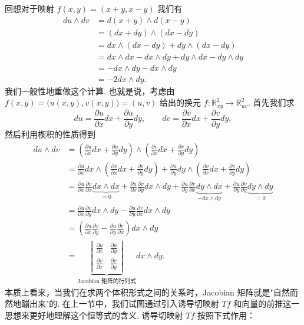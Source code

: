 回想对于映射 $f(x,y)=(x+y,x-y)$ 我们有
\begin{align*}
du\wedge dv&=d(x+y)\wedge d(x-y)\\
&=(dx+dy)\wedge(dx-dy)\\
&=dx\wedge(dx-dy)+dy\wedge(dx-dy)\\
&=dx\wedge dx-dx\wedge dy+dy\wedge dx-dy\wedge dy\\
&=-dx\wedge dy-dx\wedge dy\\
&=-2dx\wedge dy.
\end{align*}
我们一般性地重做这个计算. 也就是说，考虑由 $f(x,y)=\bigl(u(x,y),v(x,y)\bigr)=(u,v)$ 给出的换元 $f:\mathbb{R}^2_{xy}\to\mathbb{R}^2_{uv}$. 首先我们求
\[
du=\frac{\partial u}{\partial x}dx+\frac{\partial u}{\partial y}dy,\qquad
dv=\frac{\partial v}{\partial x}dx+\frac{\partial v}{\partial y}dy,
\]
然后利用楔积的性质得到
\begin{align*}
du\wedge dv&=\left(\frac{\partial u}{\partial x}dx+\frac{\partial u}{\partial y}dy\right)\wedge\left(\frac{\partial v}{\partial x}dx+\frac{\partial v}{\partial y}dy\right)\\
&=\frac{\partial u}{\partial x}dx\wedge\left(\frac{\partial v}{\partial x}dx+\frac{\partial v}{\partial y}dy\right)
+\frac{\partial u}{\partial y}dy\wedge\left(\frac{\partial v}{\partial x}dx+\frac{\partial v}{\partial y}dy\right)\\
&=\frac{\partial u}{\partial x}\frac{\partial v}{\partial x}\underbrace{dx\wedge dx}_{=0}
+\frac{\partial u}{\partial x}\frac{\partial v}{\partial y}dx\wedge dy
+\frac{\partial u}{\partial y}\frac{\partial v}{\partial x}\underbrace{dy\wedge dx}_{-dx\wedge dy}
+\frac{\partial u}{\partial y}\frac{\partial v}{\partial y}\underbrace{dy\wedge dy}_{=0}\\
&=\frac{\partial u}{\partial x}\frac{\partial v}{\partial y}dx\wedge dy-\frac{\partial u}{\partial y}\frac{\partial v}{\partial x}dx\wedge dy\\
&=\left(\frac{\partial u}{\partial x}\frac{\partial v}{\partial y}-\frac{\partial u}{\partial y}\frac{\partial v}{\partial x}\right)dx\wedge dy\\
&=\underbrace{\left|\begin{matrix}\frac{\partial u}{\partial x}&\frac{\partial u}{\partial y}\\\frac{\partial v}{\partial x}&\frac{\partial v}{\partial y}\end{matrix}\right|}_{\text{Jacobian 矩阵的行列式}}dx\wedge dy.
\end{align*}
本质上看来，当我们在求两个体积形式之间的关系时，Jacobian 矩阵就是"自然而然地蹦出来"的. 在上一节中，我们试图通过引入诱导切映射 $Tf$ 和向量的前推这一思想来更好地理解这个恒等式的含义. 诱导切映射 $Tf$ 按照下式作用：
